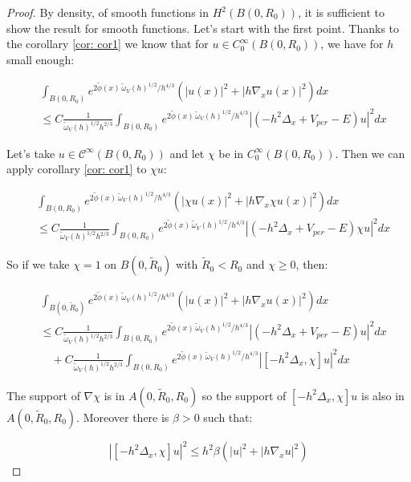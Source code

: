 \documentclass[leqno,11pt,letterpaper, english]{amsart}
\newcommand{\nn}{\nonumber}
\theoremstyle{plain}
\theoremstyle{definition}
\numberwithin{equation}{section}
\begin{document}
\begin{proof}
	By density, of smooth functions in $H^2(B(0,R_0))$, it is sufficient to show the result for smooth functions. 
Let's start with the first point. Thanks to the corollary \ref{cor: cor1} we know that for $u \in C_0^\infty(B(0,R_0))$, we have for $h$ small enough:

\begin{align}
    &\int_{B(0,R_0)} e^{2\tilde{\phi}(x)\,\tilde{\omega}_V(h)^{1/2}/ h^{4/3}} (|u(x)|^2 +|h\nabla_x u(x)|^2)dx\nn\\
    &\leq C \frac{1}{\tilde{\omega}_V(h)^{1/2}h^{2/3}}\int_{B(0,R_0)} e^{2\tilde{\phi}(x)\,\tilde{\omega}_V(h)^{1/2}/ h^{4/3}}|(-h^2\Delta_x + V_{per}- E)u|^2dx
\end{align}

Let's take $u\in \mathcal{C}^\infty(B(0,R_0))$  and let $\chi$ be in $ C_0^\infty(B(0,R_0))$. Then we can apply corollary \ref{cor: cor1} to $\chi u$:

\begin{align}
    &\int_{B(0,R_0)} e^{2\tilde{\phi}(x)\,\tilde{\omega}_V(h)^{1/2}/ h^{4/3}} (|\chi u(x)|^2 +|h\nabla_x \chi u(x)|^2)dx\nn\\
    &\leq C \frac{1}{\tilde{\omega}_V(h)^{1/2}h^{2/3}}\int_{B(0,R_0)} e^{2\tilde{\phi}(x)\,\tilde{\omega}_V(h)^{1/2}/ h^{4/3}}|(-h^2\Delta_x + V_{per}- E)\chi u|^2dx
\end{align}

So if we take $\chi=1$ on $B(0,\tilde{R}_0)$ with $\tilde{R}_0<R_0$ and $\chi\geq 0$, then:

\begin{align}
    &\int_{B(0,\tilde{R}_0)} e^{2\tilde{\phi}(x)\,\tilde{\omega}_V(h)^{1/2}/ h^{4/3}} ( |u(x)|^2 +|h\nabla_x u(x)|^2)dx\nn\\
    &\leq C \frac{1}{\tilde{\omega}_V(h)^{1/2}h^{2/3}}\int_{B(0,R_0)} e^{2\tilde{\phi}(x)\,\tilde{\omega}_V(h)^{1/2}/ h^{4/3}}|(-h^2\Delta_x + V_{per}- E) u|^2dx\nn\\
    &\quad + C \frac{1}{\tilde{\omega}_V(h)^{1/2}h^{2/3}}\int_{B(0,R_0)} e^{2\tilde{\phi}(x)\,\tilde{\omega}_V(h)^{1/2}/ h^{4/3}}|[-h^2\Delta_x ,\chi] u|^2dx
\end{align}

The support of $\nabla\chi$ is in $A(0,\tilde{R}_0,R_0)$ so the support of $[-h^2\Delta_x ,\chi] u$ is also in $A(0,\tilde{R}_0,R_0)$. Moreover there is $\beta>0$ such that:

\begin{equation}
|[-h^2\Delta_x ,\chi] u|^2 \leq  h^2 \beta(|u|^2 +|h\nabla_x u|^2)
\end{equation} 


\end{proof}
\end{document}
